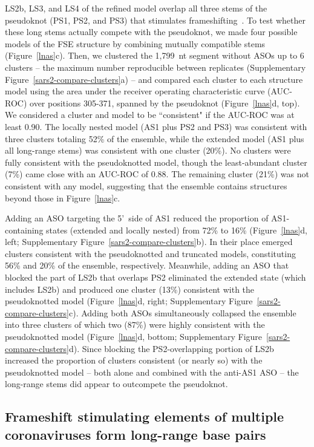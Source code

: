 \documentclass[main.tex]{subfiles}
\begin{document}
LS2b, LS3, and LS4 of the refined model overlap all three stems of the pseudoknot (PS1, PS2, and PS3) that stimulates frameshifting~\cite{KZhang2021}.
To test whether these long stems actually compete with the pseudoknot, we made four possible models of the FSE structure by combining mutually compatible stems (Figure~\ref{lnas}c).
Then, we clustered the 1,799~nt segment without ASOs up to 6 clusters -- the maximum number reproducible between replicates (Supplementary Figure~\ref{sars2-compare-clusters}a) -- and compared each cluster to each structure model using the area under the receiver operating characteristic curve (AUC-ROC) over positions 305-371, spanned by the pseudoknot (Figure~\ref{lnas}d, top).
We considered a cluster and model to be ``consistent" if the AUC-ROC was at least 0.90.
The locally nested model (AS1 plus PS2 and PS3) was consistent with three clusters totaling 52\% of the ensemble, while the extended model (AS1 plus all long-range stems) was consistent with one cluster (20\%).
No clusters were fully consistent with the pseudoknotted model, though the least-abundant cluster (7\%) came close with an AUC-ROC of 0.88.
The remaining cluster (21\%) was not consistent with any model, suggesting that the ensemble contains structures beyond those in Figure~\ref{lnas}c.

Adding an ASO targeting the 5'~side of AS1 reduced the proportion of AS1-containing states (extended and locally nested) from 72\% to 16\% (Figure~\ref{lnas}d, left; Supplementary Figure~\ref{sars2-compare-clusters}b).
In their place emerged clusters consistent with the pseudoknotted and truncated models, constituting 56\% and 20\% of the ensemble, respectively.
Meanwhile, adding an ASO that blocked the part of LS2b that overlaps PS2 eliminated the extended state (which includes LS2b) and produced one cluster (13\%) consistent with the pseudoknotted model (Figure~\ref{lnas}d, right; Supplementary Figure~\ref{sars2-compare-clusters}c).
Adding both ASOs simultaneously collapsed the ensemble into three clusters of which two (87\%) were highly consistent with the pseudoknotted model (Figure~\ref{lnas}d, bottom; Supplementary Figure~\ref{sars2-compare-clusters}d).
Since blocking the PS2-overlapping portion of LS2b increased the proportion of clusters consistent (or nearly so) with the pseudoknotted model -- both alone and combined with the anti-AS1 ASO -- the long-range stems did appear to outcompete the pseudoknot.

\subsection{Frameshift stimulating elements of multiple coronaviruses form long-range base pairs}
\end{document}
